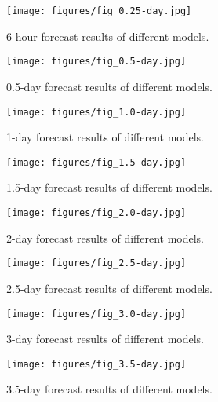 \begin{figure*}[h]
\centering
\texttt{[image: figures/fig\_0.25-day.jpg]}
\vspace{-20pt}
\caption{6-hour forecast results of different models.}
\label{fig_0.25-day}
\end{figure*}

\begin{figure*}[h]
\centering
\texttt{[image: figures/fig\_0.5-day.jpg]}
\vspace{-20pt}
\caption{0.5-day forecast results of different models.}
\label{fig_0.5-day}
\end{figure*}

\begin{figure*}[h]
\centering
\texttt{[image: figures/fig\_1.0-day.jpg]}
\vspace{-20pt}
\caption{1-day forecast results of different models.}
\label{fig_1.0-day}
\end{figure*}

\begin{figure*}[h]
\centering
\texttt{[image: figures/fig\_1.5-day.jpg]}
\vspace{-20pt}
\caption{1.5-day forecast results of different models.}
\label{fig_1.5-day}
\end{figure*}

\begin{figure*}[h]
\centering
\texttt{[image: figures/fig\_2.0-day.jpg]}
\vspace{-20pt}
\caption{2-day forecast results of different models.}
\label{fig_2.0-day}
\end{figure*}


\begin{figure*}[h]
\centering
\texttt{[image: figures/fig\_2.5-day.jpg]}
\vspace{-20pt}
\caption{2.5-day forecast results of different models.}
\label{fig_2.5-day}
\end{figure*}

\begin{figure*}[h]
\centering
\texttt{[image: figures/fig\_3.0-day.jpg]}
\vspace{-20pt}
\caption{3-day forecast results of different models.}
\label{fig_3.0-day}
\end{figure*}

\begin{figure*}[h]
\centering
\texttt{[image: figures/fig\_3.5-day.jpg]}
\vspace{-20pt}
\caption{3.5-day forecast results of different models.}
\label{fig_3.5-day}
\end{figure*}

